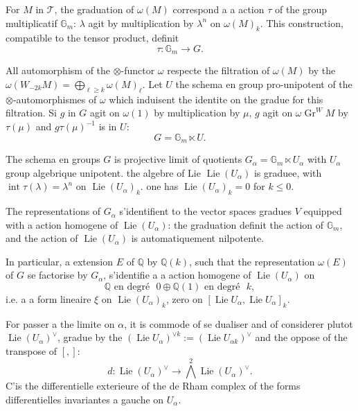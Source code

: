 \documentclass[12pt,a4paper]{article}
\theoremstyle{plain}
\theoremstyle{definition}
\theoremstyle{remark}
\DeclareMathOperator{\Lie}{Lie}
\DeclareMathOperator{\intt}{int}
\newcommand{\Q}{\mathbb{Q}}
\newcommand{\Gm}{\mathbb{G}_m}
\begin{document}
{For $M$ in $\mathcal{T}$, the graduation of $\omega(M)$ correspond {a} a action $\tau$ of the group multiplicatif $\Gm$: $\lambda$ agit by multiplication by $\lambda^n$ on $\omega(M)_k$. This construction, compatible to the tensor product, d{e}finit
\begin{equation*}
\tau : \Gm \longrightarrow G.
\end{equation*}

All automorphism of the $\otimes$-functor $\omega$ respecte the filtration of $\omega(M)$ by the $\omega(W_{-2k}M)=\bigoplus_{\ell\geq k}\omega(M)_\ell$. Let $U$ the sch{e}ma en group pro-unipotent of the $\otimes$-automorphismes of $\omega$ which induisent the identit{e} on the gradu{e} for this filtration. Si $g$ in $G$ agit on $\omega(1)$ by multiplication by $\mu$, $g$ agit on $\omega\operatorname{Gr}^W M$ by $\tau(\mu)$ and $g\tau(\mu)^{-1}$ is in $U$:
\begin{equation*}
G = \Gm \ltimes U.
\end{equation*}

The sch{e}ma en groups $G$ is projective limit of quotients $G_\alpha=\Gm\ltimes U_\alpha$ with $U_\alpha$ group alg{e}brique unipotent. the alg{e}bre of Lie $\Lie(U_\alpha)$ is gradu{e}e, with $\intt\tau(\lambda)=\lambda^n$ on $\Lie(U_\alpha)_k$. one has $\Lie(U_\alpha)_k=0$ for $k\leq 0$.

The repr{e}sentations of $G_\alpha$ s'identifient to the vector spaces gradu{e}s $V$ equipped with a action homog{e}ne of $\Lie(U_\alpha)$: the graduation d{e}finit the action of $\Gm$, and the action of $\Lie(U_\alpha)$ is automatiquement nilpotente.

In particular, a extension $E$ of $\Q$ by $\Q(k)$, such that the repr{e}sentation $\omega(E)$ of $G$ se factorise by $G_\alpha$, s'identifie {a} a action homog{e}ne of $\Lie(U_\alpha)$ on
\begin{equation*}
\Q\text{ en degr{\'e} }0 \oplus \Q(1)\text{ en degr{\'e} }k,
\end{equation*}
i.e. {a} a form lin{e}aire $\xi$ on $\Lie(U_\alpha)_k$, zero on $[\Lie U_\alpha,\Lie U_\alpha]_k$.

For passer {a} the limite on $\alpha$, it is commode of se dualiser and of consid{e}rer plut{o}t $\Lie(U_\alpha)^\vee$, gradu{e} by the $(\Lie U_\alpha)^{\vee k}:=(\Lie U_{\alpha k})^\vee$ and the oppos{e} of the transpos{e} of $[,]$:
\begin{equation*}
d : \Lie(U_\alpha)^\vee \longrightarrow \bigwedge^2\Lie(U_\alpha)^\vee.
\end{equation*}
C'is the diff{e}rentielle ext{e}rieure of the de Rham complex of the forms diff{e}rentielles invariantes {a} gauche on $U_\alpha$.

}
\end{document}
